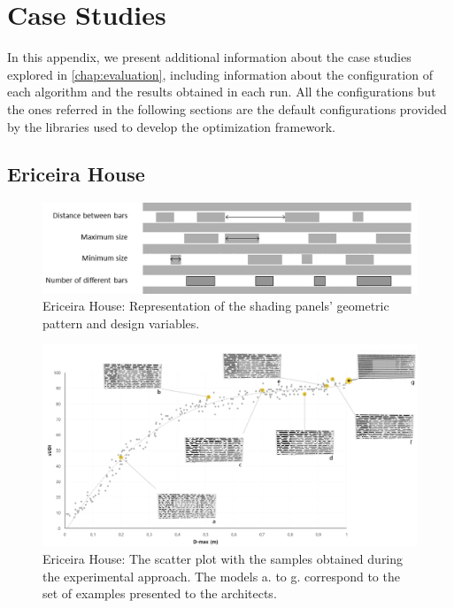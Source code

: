 \chapter{Case Studies}
\label{appendix:appendixB}

In this appendix, we present additional information about the case studies explored in \cref{chap:evaluation}, including information about the configuration of each algorithm and the results obtained in each run. All the configurations but the ones referred in the following sections are the default configurations provided by the libraries used to develop the optimization framework.

\section{Ericeira House}

\begin{figure}[htbp]
	\centering
	\includegraphics[width=\textwidth]{Images/Evaluation/Ericeira_1.jpg}
	\caption[Ericeira House: Representation of the shading panels' geometric pattern and design variables]{Ericeira House: Representation of the shading panels' geometric pattern and design variables.}
	\label{fig:ericeira_panels_explanation}
\end{figure}

\begin{figure}[htbp]
	\centering
	\includegraphics[width=\textwidth]{Images/Evaluation/Ericeira_caadria2018.PNG}
	\caption[Ericeira House: The scatter plot with the samples obtained during the experimental approach]{Ericeira House: The scatter plot with the samples obtained during the experimental approach. The models a. to g. correspond to the set of examples presented to the architects.}
	\label{fig:ericeira_doe}
\end{figure}


